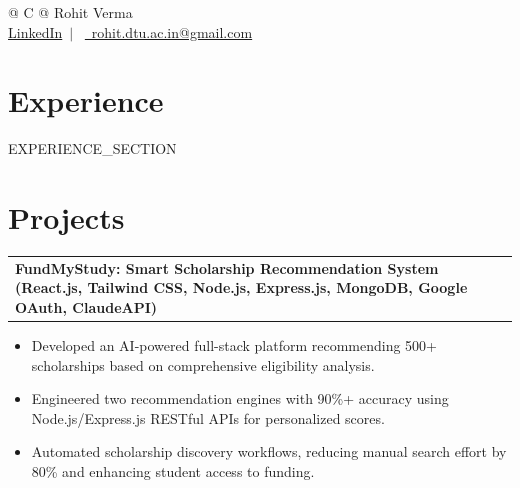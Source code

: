 \documentclass[a4paper,10pt]{article}
\makeatletter
\newenvironment{joblong}[2]
    {
    \begin{tabularx}{\linewidth}{@{}l X r@{}}
    \textbf{#1} & \hfill &  #2 \\[3.75pt]
    \end{tabularx}
    \begin{minipage}[t]{\linewidth}
    \begin{itemize}[nosep,after=\strut, leftmargin=1em, itemsep=3pt,label=--]
    }
    {
    \end{itemize}
    \end{minipage}    
    }
\makeatother
\begin{document}
\pagestyle{empty} 


\newcommand{\name}{Rohit Verma}
\newcommand{\emaila}{rohit.dtu.ac.in@gmail.com}
\newcommand{\linkedin}{\href{https://linkedin.com/in/rohit-verma-211rv}{LinkedIn}}

\begin{tabularx}{\linewidth}{@{} C @{}}
\Huge{\name}\\[7.5pt]

\linkedin \ $|$ \
\href{mailto:\emaila}{\raisebox{-0.05\height}\faEnvelope\ \emaila}
\end{tabularx}


\section{Experience}

{{EXPERIENCE_SECTION}}

\section{Projects}


\begin{joblong}{FundMyStudy: Smart Scholarship Recommendation System (React.js, Tailwind CSS, Node.js, Express.js, MongoDB, Google OAuth, ClaudeAPI)}{}
\item Developed an AI-powered full-stack platform recommending 500+ scholarships based on comprehensive eligibility analysis.
\item Engineered two recommendation engines with 90\%+ accuracy using Node.js/Express.js RESTful APIs for personalized scores.
\item Automated scholarship discovery workflows, reducing manual search effort by 80\% and enhancing student access to funding.
\end{joblong}
\vspace{3pt}
\end{document}
